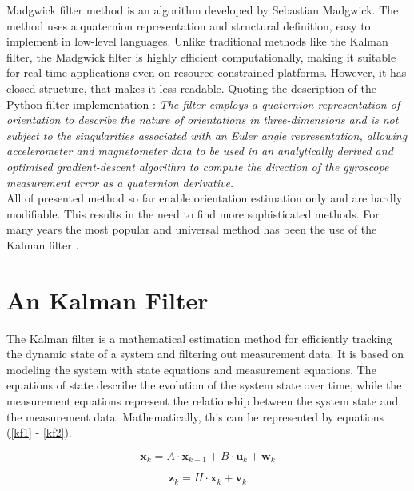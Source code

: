 Madgwick filter method is an algorithm developed by Sebastian Madgwick. The method uses a quaternion representation and structural definition, easy to implement in low-level languages. Unlike traditional methods like the Kalman filter, the Madgwick filter is highly efficient computationally, making it suitable for real-time applications even on resource-constrained platforms. However, it has closed structure, that makes it less readable. Quoting the description of the Python filter implementation \cite{madgwick2}: \textit{The filter employs a quaternion representation of orientation to describe the nature of orientations in three-dimensions and is not subject to the singularities associated with an Euler angle representation, allowing accelerometer and magnetometer data to be used in an analytically derived and optimised gradient-descent algorithm to compute the direction of the gyroscope measurement error as a quaternion derivative.}\\

All of presented method so far enable orientation estimation only and are hardly modifiable. This results in the need to find more sophisticated methods. For many years the most popular and universal method has been the use of the Kalman filter \cite{ekf_poor}.

\section{An Kalman Filter}


The Kalman filter is a mathematical estimation method for efficiently tracking the dynamic state of a system and filtering out measurement data. It is based on modeling the system with state equations and measurement equations. The equations of state describe the evolution of the system state over time, while the measurement equations represent the relationship between the system state and the measurement data. Mathematically, this can be represented by equations (\ref{kf1} - \ref{kf2}).

\begin{equation}
	\bm{x}_k = A \cdot \bm{x}_{k-1} + B \cdot \bm{u}_k + \bm{w}_k
	\label{kf1}
\end{equation}

\begin{equation}
	\bm{z}_k = H \cdot \bm{x}_k + \bm{v}_k
	\label{kf2}
\end{equation}

